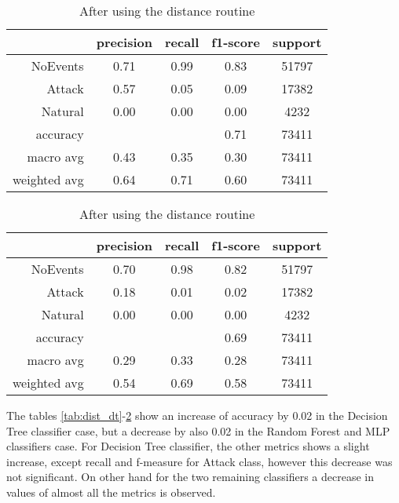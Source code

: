 \begin{table}[H]
    \centering \footnotesize
    \caption{Distance routine results for MLP classifier}  \label{tab:dist_mlp}
    \begin{subtable}[t]{.5\linewidth}
        \centering
        \caption{Before using the distance routine} 
        \begin{tabular}{rcccc}\toprule
            & precision    &recall & f1-score  & support \\\midrule
            NoEvents   &    0.71 &     0.99 &     0.83&    51797\\
            Attack     &  0.57   &   0.05   &   0.09  &   17382\\
           Natural     &  0.00   &   0.00   &   0.00  &    4232\\    
          accuracy     &         &          &   0.71  &   73411\\
         macro avg     &  0.43   &   0.35   &   0.30  &   73411\\
      weighted avg     &  0.64   &   0.71   &   0.60  &   73411\\ \bottomrule
        \end{tabular}
    \end{subtable}%
    \begin{subtable}[t]{.5\linewidth}
        \centering
        \caption{After using the distance routine} 
        \begin{tabular}{rcccc}\toprule
         &   precision    &recall & f1-score &  support  \\\midrule
    
         NoEvents  &     0.70 &     0.98 &     0.82 &  51797\\
         Attack    &   0.18   &   0.01   &   0.02   &  17382\\
        Natural    &   0.00   &   0.00   &   0.00   &   4232\\
       accuracy    &          &          &   0.69   &  73411\\
      macro avg    &   0.29   &   0.33   &   0.28   &  73411\\
   weighted avg    &   0.54   &   0.69   &   0.58   &  73411\\  \bottomrule
        \end{tabular}
    \end{subtable}
\end{table}

The tables \ref{tab:dist_dt}-\ref{tab:dist_mlp} show an increase of accuracy by 0.02 in the Decision Tree classifier case, but a decrease by also 0.02 in the Random Forest and MLP classifiers case. For Decision Tree classifier, the other metrics shows a slight increase, except recall and f-measure for Attack class, however this decrease was not significant. On other hand for the two remaining classifiers a decrease in values of almost all the metrics is observed.


